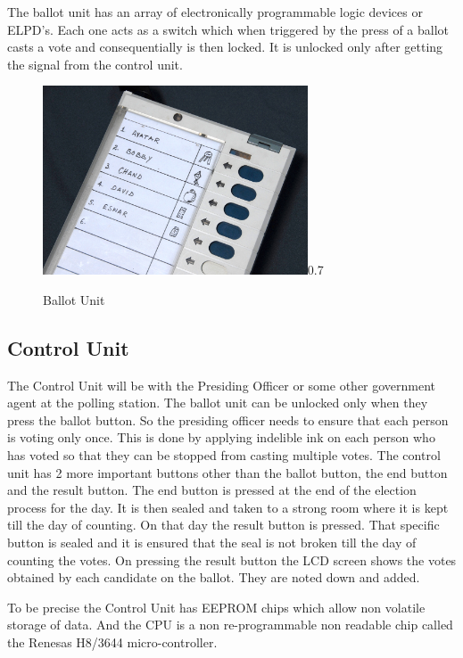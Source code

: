 \documentclass[a4paper,11pt]{article}
\begin{document}
The ballot unit has an array of electronically programmable logic devices or ELPD's. Each one acts as a switch which when triggered by the press of a ballot casts a vote and consequentially is then locked. It is unlocked only after getting the signal from the control unit. 

\begin{figure}[h!]
  \centering
  \begin{annotate}{\includegraphics[width=0.7\textwidth]{ballot.jpg}}{0.7}
  \end{annotate}
  \caption{Ballot Unit\protect\footnotemark}\label{fig:Airbus}
\end{figure}


\subsection{Control Unit}
The Control Unit will be with the Presiding Officer or some other government agent at the polling station. The ballot unit can be unlocked only when they press the ballot button. So the presiding officer needs to ensure that each person is voting only once. This is done by applying indelible ink on each person who has voted so that they can be stopped from casting multiple votes. The control unit has 2 more important buttons other than the ballot button, the end button and the result button. The end button is pressed at the end of the election process for the day. It is then sealed and taken to a strong room where it is kept till the day of counting. On that day the result button is pressed. That specific button is sealed and it is ensured that the seal is not broken till the day of counting the votes. On pressing the result button the LCD screen shows the votes obtained by each candidate on the ballot. They are noted down and added. 

To be precise the Control Unit has EEPROM chips which allow non volatile storage of data. And the CPU is a non re-programmable non readable chip called the Renesas H8/3644 micro-controller. 
\end{document}
